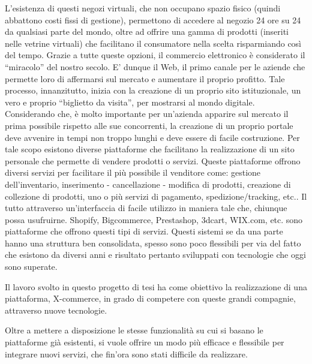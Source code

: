 \newline
L'esistenza di questi negozi virtuali, che non occupano spazio fisico (quindi abbattono costi fissi di gestione), permettono di accedere al negozio 24 ore su 24 da qualsiasi parte del mondo, oltre ad offrire una gamma di prodotti (inseriti nelle vetrine virtuali) che facilitano il consumatore nella scelta risparmiando così del tempo.
\newline
Grazie a tutte queste opzioni, il commercio elettronico è considerato il “miracolo” del nostro secolo.
\newline
E' dunque il Web, il primo canale per le aziende che permette loro di affermarsi sul mercato e aumentare il proprio profitto.
Tale processo, innanzitutto, inizia con la creazione di un proprio sito istituzionale, un vero e proprio “biglietto da visita”, per mostrarsi al mondo digitale. Considerando che, è molto importante per un’azienda apparire sul mercato il prima possibile rispetto alle sue concorrenti, la creazione di un proprio portale deve avvenire in tempi non troppo lunghi e deve essere di facile costruzione.
\newline
Per tale scopo esistono diverse piattaforme che facilitano la realizzazione di un sito personale che permette di vendere prodotti o servizi. Queste piattaforme offrono diversi servizi per facilitare il più possibile il venditore come: gestione dell’inventario, inserimento - cancellazione - modifica di prodotti, creazione di collezione di prodotti, uno o più servizi di pagamento, spedizione/tracking, etc.. Il tutto attraverso un’interfaccia di facile utilizzo in maniera tale che, chiunque possa usufruirne.
\newline
Shopify, Bigcommerce, Prestashop, 3dcart, WIX.com, etc. sono piattaforme che offrono questi tipi di servizi. Questi sistemi se da una parte hanno una struttura ben consolidata, spesso sono poco flessibili per via del fatto che esistono da diversi anni e risultato pertanto sviluppati con tecnologie che oggi sono superate.


Il lavoro svolto in questo progetto di tesi ha come obiettivo la realizzazione di una piattaforma, X-commerce, in grado di competere con queste grandi compagnie, attraverso nuove tecnologie.

Oltre a mettere a disposizione le stesse funzionalità su cui si basano le piattaforme già esistenti, si vuole offrire un modo più efficace e flessibile per integrare nuovi servizi, che fin'ora sono stati difficile da realizzare.



